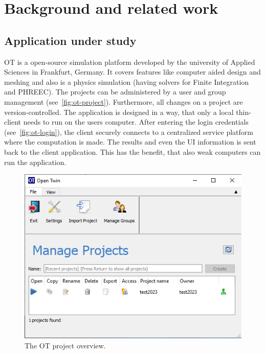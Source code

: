
\chapter{Background and related work} %

\label{chap:background} %


\section{Application under study}
\acf{OT} is a open-source simulation platform developed by the university of Applied Sciences in Frankfurt, Germany. It covers features like computer aided design and meshing and also is a physics simulation (having solvers for Finite Integration and PHREEC). The projects can be administered by a user and group management (see~\autoref{fig:ot-project}). Furthermore, all changes on a project are version-controlled. The application is designed in a way, that only a local thin-client needs to run on the users computer. After entering the login credentials (see~\autoref{fig:ot-login}), the client securely connects to a centralized service platform where the computation is made. The results and even the \ac{UI} information is sent back to the client application. This has the benefit, that also weak computers can run the application.

\begin{figure}[h]
	\centering
	\includegraphics[width=.9\textwidth]{Figures/ot-project.png}
	\caption{The \ac{OT} project overview.}
	\label{fig:ot-project}
\end{figure}

